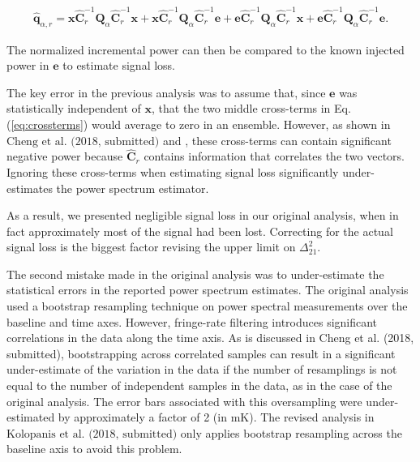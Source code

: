 \documentclass[onecolumn]{emulateapj} \shorttitle{}
\newcommand{\kolopaniscitet}{\textrm{Kolopanis et al. (2018, submitted)}}
\newcommand{\chengcitet}{\textrm{Cheng et al. (2018, submitted)}}
\begin{document}
\begin{align}
\widehat{\textbf{q}}_{\alpha,r} ={\mathbf x}\widehat{\textbf{C}}_r^{-1}\textbf{Q}_\alpha \widehat{\textbf{C}}_r^{-1}{\mathbf x}+
{\mathbf x}\widehat{\textbf{C}}_r^{-1}\textbf{Q}_\alpha \widehat{\textbf{C}}_r^{-1}{\mathbf e}+
{\mathbf e}\widehat{\textbf{C}}_r^{-1}\textbf{Q}_\alpha \widehat{\textbf{C}}_r^{-1}{\mathbf x}+
{\mathbf e}\widehat{\textbf{C}}_r^{-1}\textbf{Q}_\alpha \widehat{\textbf{C}}_r^{-1}{\mathbf e}.
\label{eq:crossterms}
\end{align}

\noindent The normalized incremental power can then be compared to the known injected power in $\mathbf{e}$ to estimate signal loss.

The key error in the previous analysis was to assume that, since $\mathbf e$ was statistically independent of $\mathbf x$, that
the two middle cross-terms in Eq. (\ref{eq:crossterms}) would
average to zero in an ensemble. 
However, as shown in $\chengcitet$ and \citet{switzer_et_al2015}, these cross-terms can contain
significant negative power because $\widehat{\textbf{C}}_r$ contains information
that correlates the two vectors. Ignoring these cross-terms when estimating signal loss significantly under-estimates the power spectrum estimator.

As a result, we presented negligible signal loss in our original analysis, when in fact approximately
most of the signal had been lost. Correcting for the actual signal loss is the biggest factor revising the upper limit
on $\Delta^2_{21}$.

The second mistake made in the original analysis was to under-estimate the statistical errors in the reported power spectrum
estimates.  The original analysis used a bootstrap resampling technique on power spectral measurements over the baseline and time axes.
However, fringe-rate filtering introduces significant correlations in the data
along the time axis.  As is discussed in \chengcitet, bootstrapping across correlated samples can result in a significant under-estimate
of the variation in the data if the number of resamplings is not equal to the number of independent samples in the data, as in the case 
of the original analysis. The error bars associated with this oversampling were under-estimated by approximately a factor of 2 (in $\textrm{mK}$).
The revised analysis in $\kolopaniscitet$ only applies bootstrap resampling across the baseline axis to avoid this problem.
\end{document}
